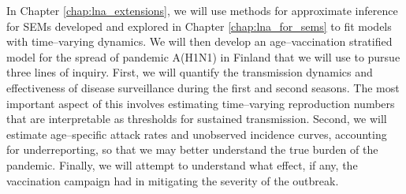 In Chapter \ref{chap:lna_extensions}, we will use methods for approximate inference for SEMs developed and explored in Chapter \ref{chap:lna_for_sems} to fit models with time--varying dynamics. We will then develop an age--vaccination stratified model for the spread of pandemic A(H1N1) in Finland that we will use to pursue three lines of inquiry. First, we will quantify the transmission dynamics and effectiveness of disease surveillance during the first and second seasons. The most important aspect of this involves estimating time--varying reproduction numbers that are interpretable as thresholds for sustained transmission. Second, we will estimate age--specific attack rates and unobserved incidence curves, accounting for underreporting, so that we may better understand the true burden of the pandemic. Finally, we will attempt to understand what effect, if any, the vaccination campaign had in mitigating the severity of the outbreak.
